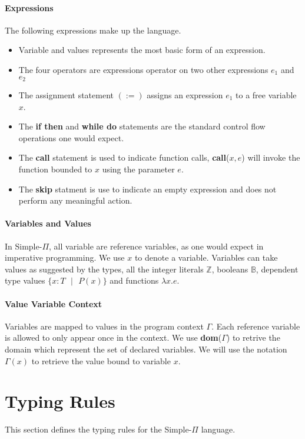 \documentclass[a4paper,12pt]{report}
\begin{document}
\paragraph{Expressions} The following expressions make up the language.
\begin{itemize}
  \item Variable and values represents the most basic form of an expression.
  \item The four operators are expressions operator on two other expressions $e_1$ 
  and $e_2$
  \item The assignment statement $(:=)$ assigns an expression $e_1$ to a 
  free variable $x$.
  \item The \textbf{if then} and \textbf{while do} statements are the standard control flow 
  operations one would expect.
  \item The \textbf{call} statement is used to indicate function calls, 
  \textbf{call}($x, e$) will invoke the function bounded to $x$ using the 
  parameter $e$.
  \item The \textbf{skip} statment is use to indicate an empty expression and 
  does not perform any meaningful action. 
\end{itemize}

\paragraph{Variables and Values} In Simple-$\Pi$, all variable are reference 
variables, as one would expect in imperative programming. We use $x$ to denote a 
variable. Variables can take values as suggested by the types, all the integer 
literals $\mathbb{Z}$, booleans $\mathbb{B}$, dependent type values 
$\{x: T\text{ }|\text{ }P(x)\}$ and functions $\lambda x.e$.

\paragraph{Value Variable Context} Variables are mapped to values in the program 
context $\Gamma$. Each reference variable is allowed to only appear once in 
the context. We use \textbf{dom}($\Gamma$) to retrive the domain which represent 
the set of declared variables. We will use the notation $\Gamma(x)$ 
to retrieve the value bound to variable $x$.

\section{Typing Rules}
This section defines the typing rules for the Simple-$\Pi$ language.
\end{document}
